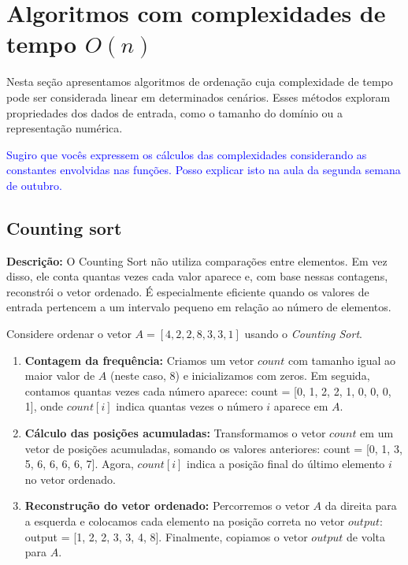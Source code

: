 \chapter{Algoritmos com complexidades de tempo 
\texorpdfstring{$O(n)$}{O(n)}}

Nesta seção apresentamos algoritmos de ordenação cuja complexidade de tempo pode ser considerada linear em determinados cenários. Esses métodos exploram propriedades dos dados de entrada, como o tamanho do domínio ou a representação numérica. 

\textcolor{blue}{Sugiro que vocês expressem os cálculos das complexidades considerando as constantes envolvidas nas funções. Posso explicar isto na aula da segunda semana de outubro.}

\section{Counting sort}
\textbf{Descrição:} O Counting Sort não utiliza comparações entre elementos. Em vez disso, ele conta quantas vezes cada valor aparece e, com base nessas contagens, reconstrói o vetor ordenado. É especialmente eficiente quando os valores de entrada pertencem a um intervalo pequeno em relação ao número de elementos.

\begin{exmp}
Considere ordenar o vetor $A = [4, 2, 2, 8, 3, 3, 1]$ usando o \textit{Counting Sort}.  

\begin{enumerate}
    \item \textbf{Contagem da frequência:}  
    Criamos um vetor $count$ com tamanho igual ao maior valor de $A$ (neste caso, 8) e inicializamos com zeros.  
    Em seguida, contamos quantas vezes cada número aparece:  count = [0, 1, 2, 2, 1, 0, 0, 0, 1], onde $count[i]$ indica quantas vezes o número $i$ aparece em $A$.

    \item \textbf{Cálculo das posições acumuladas:}  
    Transformamos o vetor $count$ em um vetor de posições acumuladas, somando os valores anteriores: count = [0, 1, 3, 5, 6, 6, 6, 6, 7]. Agora, $count[i]$ indica a posição final do último elemento $i$ no vetor ordenado.

    \item \textbf{Reconstrução do vetor ordenado:}  
    Percorremos o vetor $A$ da direita para a esquerda e colocamos cada elemento na posição correta no vetor $output$:  output = [1, 2, 2, 3, 3, 4, 8]. Finalmente, copiamos o vetor $output$ de volta para $A$.

\end{enumerate}
\end{exmp}

